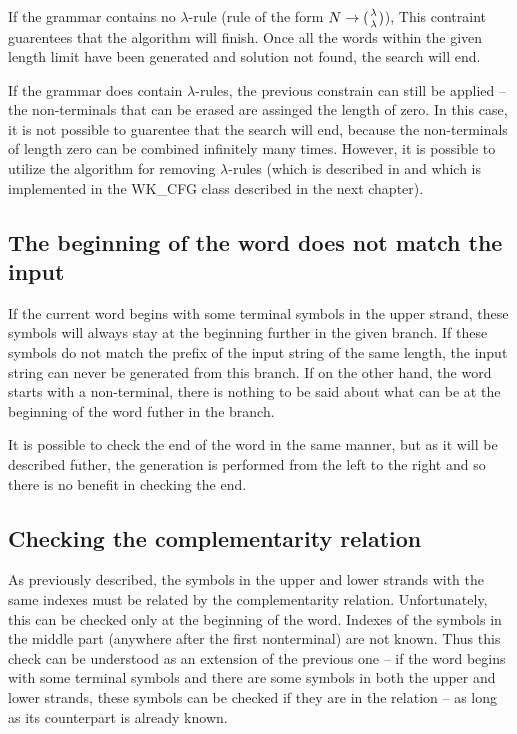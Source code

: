 If the grammar contains no $\lambda$-rule (rule of the form $N \rightarrow ({\lambda \atop \lambda})$), This contraint guarentees that the algorithm will finish. Once all the words within the given length limit have been generated and solution not found, the search will end.

If the grammar does contain $\lambda$-rules, the previous constrain can still be applied -- the non-terminals that can be erased are assinged the length of zero. In this case, it is not possible to guarentee that the search will end, because the non-terminals of length zero can be combined infinitely many times. However, it is possible to utilize the algorithm for removing $\lambda$-rules (which is described in \cite{WK_CYK} and which is implemented in the WK\_CFG class described in the next chapter).

\subsection{The beginning of the word does not match the input}
If the current word begins with some terminal symbols in the upper strand, these symbols will always stay at the beginning further in the given branch. If these symbols do not match the prefix of the input string of the same length, the input string can never be generated from this branch.
If on the other hand, the word starts with a non-terminal, there is nothing to be said about what can be at the beginning of the word futher in the branch.

It is possible to check the end of the word in the same manner, but as it will be described futher, the generation is performed from the left to the right and so there is no benefit in checking the end.

\subsection{Checking the complementarity relation}
As previously described, the symbols in the upper and lower strands with the same indexes must be related by the complementarity relation. Unfortunately, this can be checked only at the beginning of the word. Indexes of the symbols in the middle part (anywhere after the first nonterminal) are not known. Thus this check can be understood as an extension of the previous one -- if the word begins with some terminal symbols and there are some symbols in both the upper and lower strands, these symbols can be checked if they are in the relation -- as long as its counterpart is already known.

